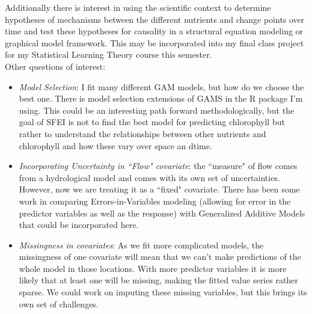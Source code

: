 \documentclass[12pt]{amsart}
\begin{document}
Additionally there is interest in using the scientific context to determine hypotheses of mechanisms between the different nutrients and change points over time and test these hypotheses for causality in a structural equation modeling or graphical model framework. This may be incorporated into my final class project for my Statistical Learning Theory course this semester.\\

Other questions of interest:

\begin{itemize}
\item \textit{Model Selection}: I fit many different GAM models, but how do we choose the best one. There is model selection extensions of GAMS in the R package I'm using. This could be an interesting path forward methodologically, but the goal of SFEI is not to find the best model for predicting chlorophyll but rather to understand the relationships between other nutrients and chlorophyll and how these vary over space an dtime.
\item \textit{Incorporating Uncertainty in ``Flow" covariate}: the ``measure" of flow comes from a hydrological model and comes with its own set of uncertainties. However, now we are treating it as a ``fixed" covariate. There has been some work in comparing Errors-in-Variables modeling (allowing for error in the predictor variables as well as the response) with Generalized Additive Models that could be incorporated here.
\item \textit{Missingness in covariates}: As we fit more complicated models, the missingness of one covariate will mean that we can't make predictions of the whole model in those locations. With more predictor variables it is more likely that at least one will be missing, making the fitted value series rather sparse. We could work on imputing these missing variables, but this brings its own set of challenges. 
\end{itemize}
\end{document}
